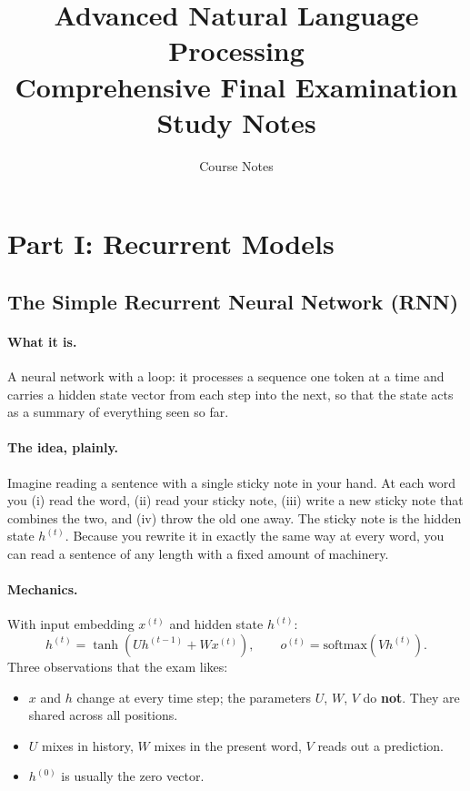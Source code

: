 \documentclass[11pt,a4paper]{article}
\title{Advanced Natural Language Processing\\ Comprehensive Final Examination Study Notes}
\author{Course Notes}
\date{}
\begin{document}
\maketitle

\setcounter{tocdepth}{1}
\tableofcontents
\newpage

\section{Part I: Recurrent Models}

\subsection{The Simple Recurrent Neural Network (RNN)}

\paragraph{What it is.} A neural network with a loop: it processes a sequence one token at
a time and carries a hidden state vector from each step into the next, so that the state
acts as a summary of everything seen so far.

\paragraph{The idea, plainly.} Imagine reading a sentence with a single sticky note in your
hand. At each word you (i) read the word, (ii) read your sticky note, (iii) write a new
sticky note that combines the two, and (iv) throw the old one away. The sticky note is the
hidden state $h^{(t)}$. Because you rewrite it in exactly the same way at every word, you
can read a sentence of any length with a fixed amount of machinery.

\paragraph{Mechanics.} With input embedding $x^{(t)}$ and hidden state $h^{(t)}$:
\[
h^{(t)} = \tanh\!\left(U h^{(t-1)} + W x^{(t)}\right), \qquad
o^{(t)} = \mathrm{softmax}\!\left(V h^{(t)}\right).
\]
Three observations that the exam likes:
\begin{itemize}
\item $x$ and $h$ change at every time step; the parameters $U$, $W$, $V$ do \textbf{not}.
  They are shared across all positions.
\item $U$ mixes in history, $W$ mixes in the present word, $V$ reads out a prediction.
\item $h^{(0)}$ is usually the zero vector.
\end{itemize}
\end{document}
